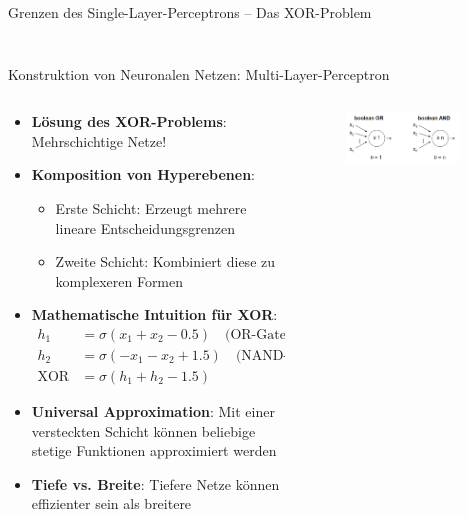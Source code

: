 \documentclass[aspectratio=1610, xcolor=dvipsnames, 9pt]{beamer}
\begin{document}
\begin{frame}{Grenzen des Single-Layer-Perceptrons -- Das XOR-Problem}
\begin{columns}
\begin{column}{0.4\textwidth}
\begin{figure}
        \end{figure}
    \end{column}
  \end{columns}
\end{frame}

      \begin{frame}{Konstruktion von Neuronalen Netzen: Multi-Layer-Perceptron}
        \begin{columns}
          \begin{column}{0.7\textwidth}
            \begin{itemize}
              \item \textbf{Lösung des XOR-Problems}: Mehrschichtige Netze!
              \item \textbf{Komposition von Hyperebenen}: 
              \begin{itemize}
                \item Erste Schicht: Erzeugt mehrere lineare Entscheidungsgrenzen
                \item Zweite Schicht: Kombiniert diese zu komplexeren Formen
              \end{itemize}
              \item \textbf{Mathematische Intuition für XOR}:
              \begin{align}
                h_1 &= \sigma(x_1 + x_2 - 0.5) \quad \text{(OR-Gate)} \\
                h_2 &= \sigma(-x_1 - x_2 + 1.5) \quad \text{(NAND-Gate)} \\
                \text{XOR} &= \sigma(h_1 + h_2 - 1.5)
              \end{align}
              \item \textbf{Universal Approximation}: Mit einer versteckten Schicht können beliebige stetige Funktionen approximiert werden
              \item \textbf{Tiefe vs. Breite}: Tiefere Netze können effizienter sein als breitere
            \end{itemize}
          \end{column}
          \begin{column}{0.3\textwidth}
            \begin{figure}
              \centering
                          \includegraphics[width=0.9\textwidth]{images/OR_AND.png}

\end{figure}
\end{column}
\end{columns}
\end{frame}
\end{document}
